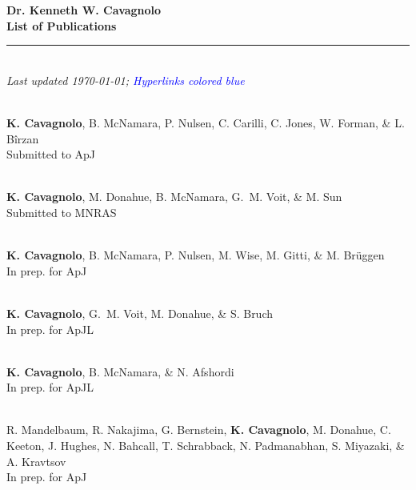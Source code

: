 \documentclass[11pt]{cv}
\begin{document}
\begin{center}
{\large \textbf{Dr. Kenneth W. Cavagnolo\\List of Publications}}\\
\rule{17.35cm}{2pt}\\
\footnotesize
{\it Last updated \today; \textcolor{blue}{Hyperlinks colored blue}}
\normalsize
\end{center}

\begin{llist}



{}\\
{\bf K. Cavagnolo}, B. McNamara, P. Nulsen, C. Carilli, C. Jones, W. Forman, \& L. B\^irzan\\
Submitted to ApJ

{}\\
{\bf K. Cavagnolo}, M. Donahue, B. McNamara, G.~M. Voit, \& M. Sun\\
Submitted to MNRAS

{}\\
{\bf K. Cavagnolo}, B. McNamara, P. Nulsen, M. Wise, M. Gitti, \& M. Br\"uggen\\
In prep. for ApJ

{}\\
{\bf K. Cavagnolo}, G.~M. Voit, M. Donahue, \& S. Bruch\\
In prep. for ApJL

{}\\
{\bf K. Cavagnolo}, B. McNamara, \& N. Afshordi\\
In prep. for ApJL

{}\\
R. Mandelbaum, R. Nakajima, G. Bernstein, {\bf K. Cavagnolo}, M. Donahue, C. Keeton, J. Hughes, N. Bahcall, T. Schrabback, N. Padmanabhan, S. Miyazaki, \& A. Kravtsov\\
In prep. for ApJ


\end{llist}
\end{document}
